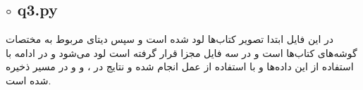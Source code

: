 \documentclass[a4paper,12pt]{article}
\begin{document}
\subsection*{$\circ$ q3.py}
در این فایل ابتدا تصویر کتاب‌ها لود شده است و سپس دیتای مربوط به مختصات گوشه‌های کتاب‌ها است و در سه فایل مجزا قرار گرفته است لود می‌شود و در ادامه با استفاده از این داده‌ها و با استفاده از 
عمل
انجام شده و نتایج در 
،
و
و در مسیر
ذخیره شده است.
\end{document}

